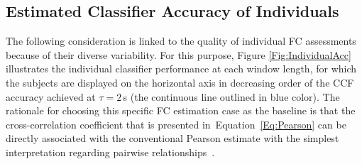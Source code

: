 \subsection{Estimated Classifier Accuracy of Individuals}

The following consideration is linked to the quality of individual FC assessments because of their diverse variability. For this purpose, Figure \ref{Fig:IndividualAcc} illustrates the individual classifier performance at each window length, for which the subjects are displayed on the horizontal axis in decreasing order of the CCF accuracy achieved at $\tau=2$\,{s} (the continuous line outlined in blue color). The rationale for choosing this specific FC estimation case as the baseline is that the cross-correlation coefficient that is presented in~Equation~\eqref{Eq:Pearson} can be directly associated with the conventional Pearson estimate with the simplest interpretation regarding pairwise relationships~\cite{georgiadis2019connectivity}.

